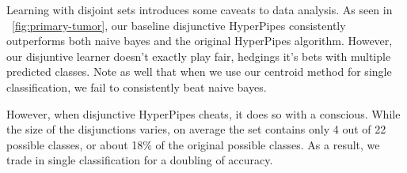\begin{figure*}
\centering
{}
\caption{Incremental results from a discrete dataset with many class values.}
\label{fig:primary-tumor}
\end{figure*}

Learning with disjoint sets introduces some caveats to data analysis. As seen in ~\ref{fig:primary-tumor}, our baseline disjunctive HyperPipes consistently outperforms both naive bayes and the original HyperPipes algorithm. However, our disjuntive learner doesn't exactly play fair, hedgings it's bets with multiple predicted classes. Note as well that when we use our centroid method for single classification, we fail to consistently beat naive bayes.

However, when disjunctive HyperPipes cheats, it does so with a conscious. While the size of the disjunctions varies, on average the set contains only 4 out of 22 possible classes, or about 18\% of the original possible classes. As a result, we trade in single classification for a doubling of accuracy.
